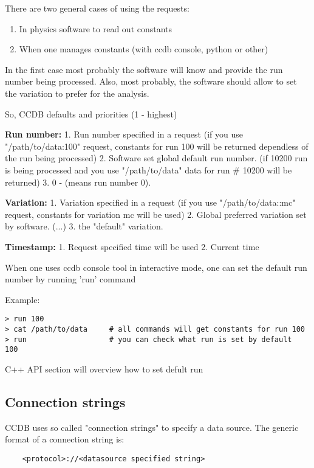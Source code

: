 \documentclass{article}
\begin{document}
There are two general cases of using the requests:
\begin{enumerate}
  \item In physics software to read out constants
  \item When one manages constants (with ccdb console, python or other)
\end{enumerate}
\vspace{1 em}

In the first case most probably the software will know and provide the run 
number being processed. Also, most probably, the software should allow to set 
the variation to prefer for the analysis.

So, CCDB defaults and priorities (1 - highest)

\textbf{Run number:}
1. Run number specified in a request
(if you use "/path/to/data:100" request, constants for run 100 will be returned dependless of the run being processed)
2. Software set global default run number.
(if 10200 run is being processed and you use "/path/to/data" data for run \# 10200 will be returned)
3. 0 - (means run number 0).

\textbf{Variation:}
1. Variation specified in a request
(if you use "/path/to/data::mc" request, constants for variation mc will be used)
2. Global preferred variation set by software.
(...)
3. the "default" variation.


\textbf{Timestamp:}
1. Request specified time will be used
2. Current time

When one uses ccdb console tool in interactive mode, one can set the default run number by running 'run' command

Example:
\begin{verbatim}
> run 100
> cat /path/to/data     # all commands will get constants for run 100
> run                   # you can check what run is set by default
100
\end{verbatim}
C++ API section will overview how to set defult run


\subsection{Connection strings}\label{sec:connection}


CCDB uses so called "connection strings" to specify a data source.
The generic format of a connection string is:
\begin{verbatim}
    <protocol>://<datasource specified string>
\end{verbatim}
\end{document}
